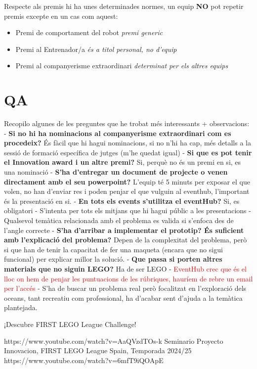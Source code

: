 \documentclass{article}
\newcommand\dubtes[1]{\textcolor{red}{#1}}
\begin{document}
Respecte als premis hi ha unes determinades normes, un equip \textbf{NO} pot repetir premis excepte en un cas com aquest:

\begin{itemize}
    \item Premi de comportament del robot \textit{premi generic}
    \item Premi al Entrenador/a \textit{és a titol personal, no d'equip}
    \item Premi al companyerisme extraordinari \textit{determinat per els altres equips}
\end{itemize}


\section{QA}

Recopilo algunes de les preguntes que he trobat més interessants + observacions:
\hfill \break\hfill \break
- \textbf{Si no hi ha nominacions al companyerisme extraordinari com es procedeix?} És fàcil que hi hagui nominacions, si no n'hi ha cap, més detalls a la sessió de formació específica de jutges (m’he quedat igual)
\hfill \break\hfill \break
- \textbf{Si que es pot tenir el Innovation award i un altre premi?} Si, perquè no és un premi en si, es una nominació
\hfill \break\hfill \break
- \textbf{S’ha d’entregar un document de projecte o venen directament amb el seu powerpoint?} L’equip té 5 minuts per exposar el que volen, no han d’enviar res i poden penjar el que vulguin al eventhub, l'important és la presentació en si.
\hfill \break\hfill \break
- \textbf{En tots els events s’utilitza el eventHub?} Si, es obligatori
\hfill \break\hfill \break
- S’intenta per tots els mitjans que hi hagui públic a les presentacions
\hfill \break\hfill \break
- Qualsevol temàtica relacionada amb el problema es valida si s’enfoca des de l’angle correcte
\hfill \break\hfill \break
- \textbf{S’ha d’arribar a implementar el prototip? És suficient amb l’explicació del problema?} Depen de la complexitat del problema, però si que han de tenir la capacitat de fer una maqueta (encara que no sigui funcional) per explicar millor la solució.
\hfill \break\hfill \break
- \textbf{Que passa si porten altres materials que no siguin LEGO?} Ha de ser LEGO
\hfill \break\hfill \break
- \dubtes{EventHub crec que és el lloc on hem de penjar les puntuacions de les rúbriques, hauríem de rebre un email per l’accés}
\hfill \break\hfill \break
- S’ha de buscar un problema real però focalitzat en l’exploració dels oceans, tant recreatiu com professional, ha d’acabar sent d’ajuda a la temàtica plantejada.


\begin{thebibliography}{9}

¡Descubre FIRST LEGO League Challenge!

https://www.youtube.com/watch?v=AaQVzdTOs-k
Seminario Proyecto Innovacion, FIRST LEGO League Spain, Temporada 2024/25  
https://www.youtube.com/watch?v=6mfT9iQOApE

\end{thebibliography}
\end{document}
